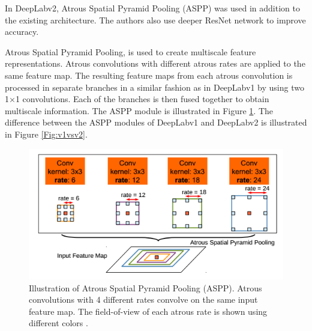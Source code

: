 In DeepLabv2, Atrous Spatial Pyramid Pooling (ASPP) was used in addition to the existing architecture. The authors also use deeper ResNet network to improve accuracy.

Atrous Spatial Pyramid Pooling, is used to create multiscale feature representations. Atrous convolutions with different atrous rates are applied to the same feature map. The resulting feature maps from each atrous convolution is processed in separate branches in a similar fashion as in DeepLabv1 by using two 1$\times$1 convolutions. Each of the branches is then fused together to obtain multiscale information. The ASPP module is illustrated in Figure \ref{Fig:aspp}. The difference between the ASPP modules of DeepLabv1 and DeepLabv2 is illustrated in Figure \ref{Fig:v1vsv2}.

	\begin{figure}[h]
		\centering
		\includegraphics[width=0.6\linewidth]{images/aspp}
		\caption{Illustration of Atrous Spatial Pyramid Pooling (ASPP). Atrous convolutions with 4 different rates convolve on the same input feature map. The field-of-view of each atrous rate is shown using different colors \cite{DBLP:journals/corr/ChenPK0Y16}.}
		\label{Fig:aspp}
	\end{figure}
	
